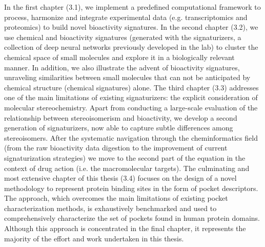 In the first chapter (3.1), we implement a predefined computational framework to process, harmonize and integrate experimental data (e.g. transcriptomics and proteomics) to build novel bioactivity signatures. In the second chapter (3.2), we use chemical and bioactivity signatures (generated with the signaturizers, a collection of deep neural networks previously developed in the lab) to cluster the chemical space of small molecules and explore it in a biologically relevant manner. In addition, we also illustrate the advent of bioactivity signatures, unraveling similarities between small molecules that can not be anticipated by chemical structure (chemical signatures) alone. The third chapter (3.3) addresses one of the main limitations of existing signaturizers: the explicit consideration of molecular stereochemistry. Apart from conducting a large-scale evaluation of the relationship between stereoisomerism and bioactivity, we develop a second generation of signaturizers, now able to capture subtle differences among stereoisomers. After the systematic navigation through the cheminformatics field (from the raw bioactivity data digestion to the improvement of current signaturization strategies) we move to the second part of the equation in the context of drug action (i.e. the macromolecular targets). The culminating and most extensive chapter of this thesis (3.4) focuses on the design of a novel methodology to represent protein binding sites in the form of pocket descriptors. The approach, which overcomes the main limitations of existing pocket characterization methods, is exhaustively benchmarked and used to comprehensively characterize the set of pockets found in human protein domains. Although this approach is concentrated in the final chapter, it represents the majority of the effort and work undertaken in this thesis.

\renewcommand{\thesubsection}{\thechapter.\arabic{section}.\arabic{subsection}}
